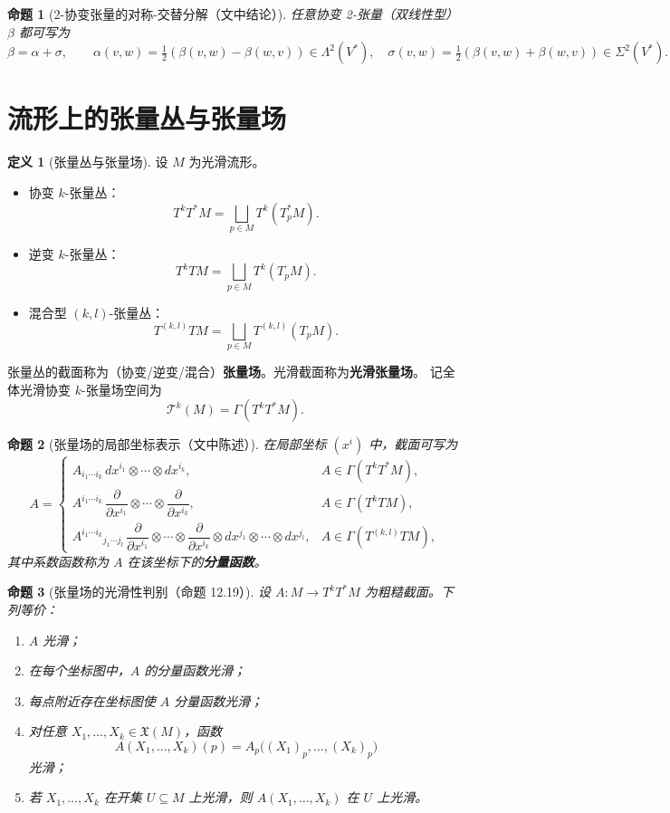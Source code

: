 \documentclass[11pt]{article}
\theoremstyle{definition}
\newtheorem{definition}{定义}[section]
\theoremstyle{plain}
\newtheorem{proposition}{命题}[section]
\newcommand{\X}{\mathfrak{X}}
\newcommand{\T}{\mathcal{T}}
\newcommand{\ot}{\otimes}
\begin{document}
\begin{proposition}[2-协变张量的对称-交替分解（文中结论）]
任意协变 2-张量（双线性型）$\beta$ 都可写为
\[
\beta=\alpha+\sigma,\qquad
\alpha(v,w)=\tfrac12(\beta(v,w)-\beta(w,v))\in \Lambda^2(V^*),\quad
\sigma(v,w)=\tfrac12(\beta(v,w)+\beta(w,v))\in \Sigma^2(V^*).
\]
\end{proposition}

\section{流形上的张量丛与张量场}

\begin{definition}[张量丛与张量场]
设 $M$ 为光滑流形。
\begin{itemize}[leftmargin=2em]
\item 协变 $k$-张量丛：
\[
T^kT^*M=\bigsqcup_{p\in M} T^k(T_p^*M).
\]
\item 逆变 $k$-张量丛：
\[
T^kTM=\bigsqcup_{p\in M} T^k(T_pM).
\]
\item 混合型 $(k,l)$-张量丛：
\[
T^{(k,l)}TM=\bigsqcup_{p\in M} T^{(k,l)}(T_pM).
\]
\end{itemize}
张量丛的截面称为（协变/逆变/混合）\textbf{张量场}。光滑截面称为\textbf{光滑张量场}。
记全体光滑协变 $k$-张量场空间为
\[
\T^k(M)=\Gamma(T^kT^*M).
\]
\end{definition}

\begin{proposition}[张量场的局部坐标表示（文中陈述）]
在局部坐标 $(x^i)$ 中，截面可写为
\[
A=
\begin{cases}
A_{i_1\cdots i_k}\,dx^{i_1}\ot\cdots\ot dx^{i_k}, & A\in\Gamma(T^kT^*M),\\[4pt]
A^{i_1\cdots i_k}\,\dfrac{\partial}{\partial x^{i_1}}\ot\cdots\ot\dfrac{\partial}{\partial x^{i_k}}, & A\in\Gamma(T^kTM),\\[8pt]
A^{i_1\cdots i_k}{}_{j_1\cdots j_l}\,
\dfrac{\partial}{\partial x^{i_1}}\ot\cdots\ot\dfrac{\partial}{\partial x^{i_k}}
\ot dx^{j_1}\ot\cdots\ot dx^{j_l}, & A\in\Gamma(T^{(k,l)}TM),
\end{cases}
\]
其中系数函数称为 $A$ 在该坐标下的\textbf{分量函数}。
\end{proposition}

\begin{proposition}[张量场的光滑性判别（命题 12.19）]
设 $A:M\to T^kT^*M$ 为粗糙截面。下列等价：
\begin{enumerate}[label=(\alph*),leftmargin=2em]
\item $A$ 光滑；
\item 在每个坐标图中，$A$ 的分量函数光滑；
\item 每点附近存在坐标图使 $A$ 分量函数光滑；
\item 对任意 $X_1,\dots,X_k\in\X(M)$，函数
\[
A(X_1,\dots,X_k)(p)=A_p\big((X_1)_p,\dots,(X_k)_p\big)
\]
光滑；
\item 若 $X_1,\dots,X_k$ 在开集 $U\subseteq M$ 上光滑，则 $A(X_1,\dots,X_k)$ 在 $U$ 上光滑。
\end{enumerate}
\end{proposition}
\end{document}
